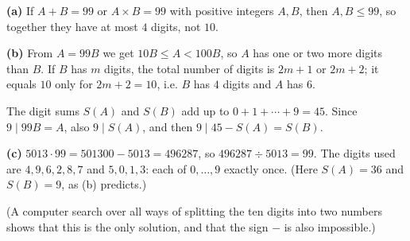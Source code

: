 \textbf{(a)} If $A+B=99$ or $A\times B=99$ with positive integers $A,B$, then $A,B\le99$, so together they have at most $4$ digits, not $10$.

\textbf{(b)} From $A=99B$ we get $10B\le A<100B$, so $A$ has one or two more digits than $B$. If $B$ has $m$ digits, the total number of digits is $2m+1$ or $2m+2$; it equals $10$ only for $2m+2=10$, i.e. $B$ has $4$ digits and $A$ has $6$.

The digit sums $S(A)$ and $S(B)$ add up to $0+1+\cdots+9=45$. Since $9\mid99B=A$, also $9\mid S(A)$, and then $9\mid45-S(A)=S(B)$.

\textbf{(c)} $5013\cdot99=501300-5013=496287$, so $496287\div5013=\boxed{99}$. The digits used are $4,9,6,2,8,7$ and $5,0,1,3$: each of $0,\ldots,9$ exactly once. (Here $S(A)=36$ and $S(B)=9$, as (b) predicts.)

(A computer search over all ways of splitting the ten digits into two numbers shows that this is the only solution, and that the sign $-$ is also impossible.)
